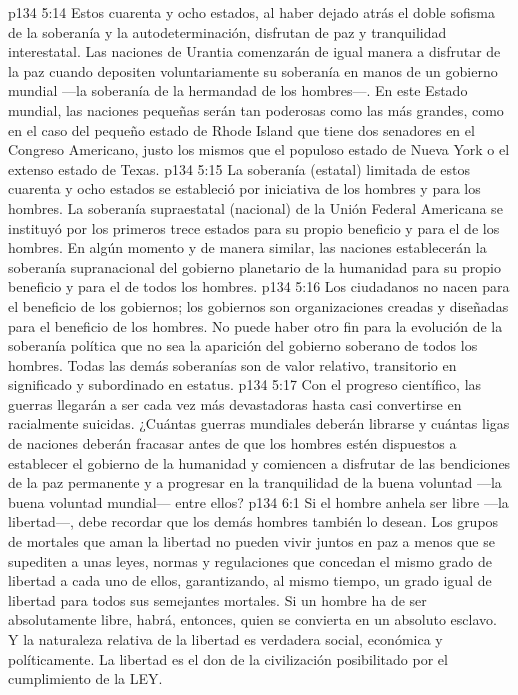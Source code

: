 \vs p134 5:14 \pc Estos cuarenta y ocho estados, al haber dejado atrás el doble sofisma de la soberanía y la autodeterminación, disfrutan de paz y tranquilidad interestatal. Las naciones de Urantia comenzarán de igual manera a disfrutar de la paz cuando depositen voluntariamente su soberanía en manos de un gobierno mundial ---la soberanía de la hermandad de los hombres---. En este Estado mundial, las naciones pequeñas serán tan poderosas como las más grandes, como en el caso del pequeño estado de Rhode Island que tiene dos senadores en el Congreso Americano, justo los mismos que el populoso estado de Nueva York o el extenso estado de Texas.
\vs p134 5:15 La soberanía (estatal) limitada de estos cuarenta y ocho estados se estableció por iniciativa de los hombres y para los hombres. La soberanía supraestatal (nacional) de la Unión Federal Americana se instituyó por los primeros trece estados para su propio beneficio y para el de los hombres. En algún momento y de manera similar, las naciones establecerán la soberanía supranacional del gobierno planetario de la humanidad para su propio beneficio y para el de todos los hombres.
\vs p134 5:16 Los ciudadanos no nacen para el beneficio de los gobiernos; los gobiernos son organizaciones creadas y diseñadas para el beneficio de los hombres. No puede haber otro fin para la evolución de la soberanía política que no sea la aparición del gobierno soberano de todos los hombres. Todas las demás soberanías son de valor relativo, transitorio en significado y subordinado en estatus.
\vs p134 5:17 Con el progreso científico, las guerras llegarán a ser cada vez más devastadoras hasta casi convertirse en racialmente suicidas. ¿Cuántas guerras mundiales deberán librarse y cuántas ligas de naciones deberán fracasar antes de que los hombres estén dispuestos a establecer el gobierno de la humanidad y comiencen a disfrutar de las bendiciones de la paz permanente y a progresar en la tranquilidad de la buena voluntad ---la buena voluntad mundial--- entre ellos?
\vs p134 6:1 Si el hombre anhela ser libre ---la libertad---, debe recordar que  los demás hombres también lo desean. Los grupos de mortales que aman la libertad no pueden vivir juntos en paz a menos que se supediten a unas leyes, normas y regulaciones que concedan el mismo grado de libertad a cada uno de ellos, garantizando, al mismo tiempo, un grado igual de libertad para todos sus semejantes mortales. Si un hombre ha de ser absolutamente libre, habrá, entonces, quien se convierta en un absoluto esclavo. Y la naturaleza relativa de la libertad es verdadera social, económica y políticamente. La libertad es el don de la civilización posibilitado por el cumplimiento de la LEY.
